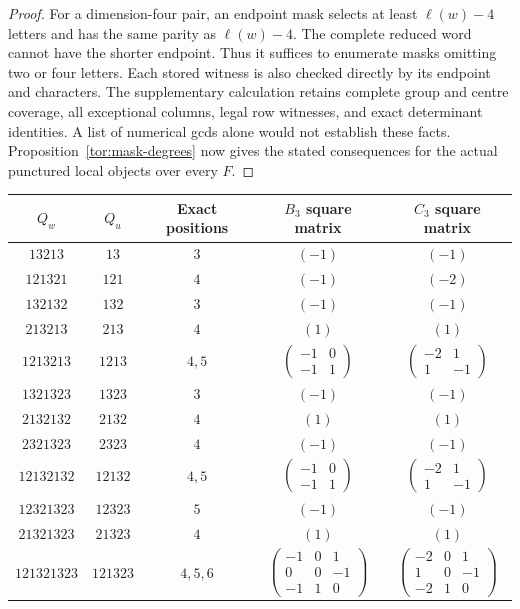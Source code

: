 \begin{proof}
For a dimension-four pair, an endpoint mask selects at least $\ell(w)-4$ letters and has the same parity as $\ell(w)-4$. The complete reduced word cannot have the shorter endpoint. Thus it suffices to enumerate masks omitting two or four letters. Each stored witness is also checked directly by its endpoint and characters. The supplementary calculation retains complete group and centre coverage, all exceptional columns, legal row witnesses, and exact determinant identities. A list of numerical gcds alone would not establish these facts. Proposition~\ref{tor:mask-degrees} now gives the stated consequences for the actual punctured local objects over every $F$.
\end{proof}

\begin{table}[tbp]
\centering
\small
\renewcommand{\arraystretch}{1.3}
\begin{tabular}{@{}ccccc@{}}
\toprule
$Q_w$&$Q_u$&Exact positions&$B_3$ square matrix&$C_3$ square matrix\\
\midrule
$13213$&$13$&$3$&$(-1)$&$(-1)$\\
$121321$&$121$&$4$&$(-1)$&$(-2)$\\
$132132$&$132$&$3$&$(-1)$&$(-1)$\\
$213213$&$213$&$4$&$(1)$&$(1)$\\
$1213213$&$1213$&$4,5$&$\begin{pmatrix}-1&0\\-1&1\end{pmatrix}$&$\begin{pmatrix}-2&1\\1&-1\end{pmatrix}$\\
$1321323$&$1323$&$3$&$(-1)$&$(-1)$\\
$2132132$&$2132$&$4$&$(1)$&$(1)$\\
$2321323$&$2323$&$4$&$(-1)$&$(-1)$\\
$12132132$&$12132$&$4,5$&$\begin{pmatrix}-1&0\\-1&1\end{pmatrix}$&$\begin{pmatrix}-2&1\\1&-1\end{pmatrix}$\\
$12321323$&$12323$&$5$&$(-1)$&$(-1)$\\
$21321323$&$21323$&$4$&$(1)$&$(1)$\\
$121321323$&$121323$&$4,5,6$&$\begin{pmatrix}-1&0&1\\0&0&-1\\-1&1&0\end{pmatrix}$&$\begin{pmatrix}-2&0&1\\1&0&-1\\-2&1&0\end{pmatrix}$\\

\end{tabular}
\end{table}
